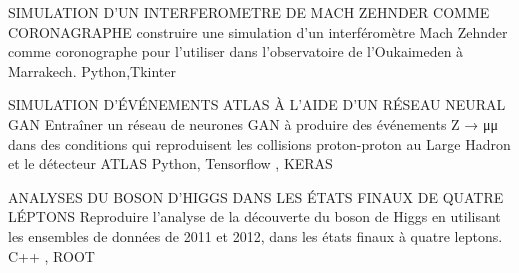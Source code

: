 %
%
%


\begin{projects}
	\project
	{SIMULATION D'UN INTERFEROMETRE DE MACH ZEHNDER COMME CORONAGRAPHE}{}
	{}
	{construire une simulation d'un interféromètre Mach Zehnder comme coronographe pour l'utiliser dans l'observatoire de l'Oukaimeden à Marrakech.}
	{Python,Tkinter}
				
	\project
	{SIMULATION D'ÉVÉNEMENTS ATLAS À L'AIDE D'UN RÉSEAU NEURAL GAN}{}
	{}
	{Entraîner un réseau de neurones GAN à produire des événements Z → μμ dans des conditions qui reproduisent les collisions proton-proton au Large Hadron et le détecteur ATLAS}
	{Python, Tensorflow , KERAS}

	\project
	{ANALYSES DU BOSON D'HIGGS DANS LES ÉTATS FINAUX DE QUATRE LÉPTONS}{}
	{}
	{Reproduire l'analyse de la découverte du boson de Higgs en utilisant les ensembles de données de 2011 et 2012, dans les états finaux à quatre leptons.}
	{C++ , ROOT}


\end{projects}

